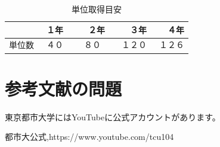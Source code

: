 \documentclass[11pt,a4j,twocolumn]{jarticle}
\begin{document}
\begin{table}[h]
\caption{単位取得目安}
\label{table1}
\begin{center}
\begin{tabular}{|l|c|c|c|c|}\hline
     &１年　&　２年　&　３年　&　４年 \\ \hline
    単位数 & ４０ & ８０ & １２０ & １２６ \\  \hline 
\end{tabular}
\end{center}
\end{table}


\section{参考文献の問題}
東京都市大学にはYouTubeに公式アカウント\cite{ref1}があります。

\begin{thebibliography}{9}
都市大公式,https://www.youtube.com/tcu104
\end{thebibliography}

\end{document}
